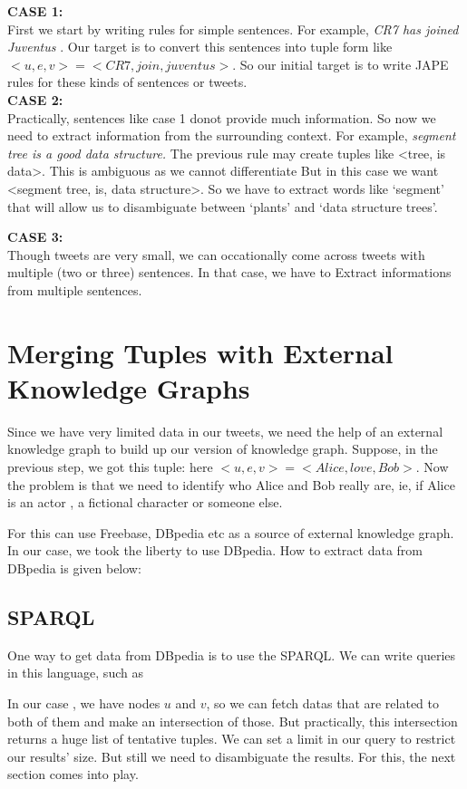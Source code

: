 \textbf{ CASE 1: } \\
First we start by writing rules for simple sentences. For example, \textit{ CR7 has joined Juventus }. Our target is to 
convert this sentences into tuple form like $<u,e,v> = <CR7 , join, juventus > $. So our initial target is to
 write JAPE rules for these kinds of sentences or tweets. \\ 

\textbf{ CASE 2: } \\
Practically, sentences like case 1 donot provide much information. So now we need to extract 
information from the surrounding context. For example, \textit{ segment tree is a good data structure. } 
The previous rule may create tuples like <tree, is data>. This is ambiguous as we cannot differentiate  But in this case we want <segment tree, is, data structure>. 
So we have to extract words like `segment' that will allow us to disambiguate between `plants' and `data structure trees'.

\textbf{ CASE 3: } \\ 
Though tweets are very small, we can occationally come across tweets with multiple (two or three) sentences. In that case,
we have to Extract informations from multiple sentences.




\section{ Merging Tuples with External Knowledge Graphs }
Since we have very limited data in our tweets, we need the help of an external knowledge graph to build 
up our version of knowledge graph. Suppose, in the previous step, we got this tuple:  here $<u, e, v> = <Alice, love, Bob>$.
Now the problem is that we need to identify who Alice and Bob really are, ie, if Alice is an actor , a fictional character or someone else.

For this can use Freebase, DBpedia etc as a source of external knowledge graph.
In our case, we took the liberty to use DBpedia. How to extract data from DBpedia is given below: 
\subsection{SPARQL}
One way to get data from DBpedia is to use the SPARQL. We can write queries in this language, such as 

In our case , we have nodes $ u $ and $ v $, so we can fetch datas that are related to both of them and make an intersection of those. 
But practically, this intersection returns a huge list of tentative tuples.  We can set a limit in our query to 
restrict our results' size. But still we need to disambiguate the results. For this, the next section comes into play.

